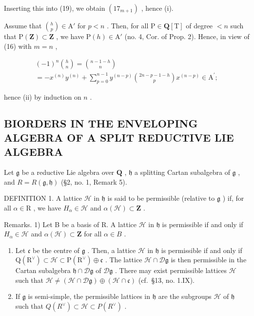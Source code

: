 Inserting this into (19), we obtain \((17_{m + 1})\) , hence (i).

Assume that \(\binom{h}{p} \in \mathrm{A}'\) for \(p < n\) . Then, for all \(\mathrm{P} \in \mathbf{Q}[\mathrm{T}]\) of degree \(< n\) such that \(\mathrm{P}(\mathbf{Z}) \subset \mathbf{Z}\) , we have \(\mathrm{P}(h) \in \mathrm{A}'\) (no. 4, Cor. of Prop. 2). Hence, in view of (16) with \(m = n\) ,

\[
\begin{array}{c} (- 1) ^ {n} \binom{h}{n} = \binom{n - 1 - h}{n} \\ = - x ^ {(n)} y ^ {(n)} + \sum_ {p = 0} ^ {n - 1} y ^ {(n - p)} \binom{2 n - p - 1 - h}{p} x ^ {(n - p)} \in \mathrm{A} ^ {\prime}; \end{array}
\]

hence (ii) by induction on \(n\) .

\subsection{BIORDERS IN THE ENVELOPING ALGEBRA OF A SPLIT REDUCTIVE LIE ALGEBRA}

Let \(\mathfrak{g}\) be a reductive Lie algebra over \(\mathbf{Q}\) , \(\mathfrak{h}\) a splitting Cartan subalgebra of \(\mathfrak{g}\) , and \(R = R(\mathfrak{g},\mathfrak{h})\) (§2, no. 1, Remark 5).

DEFINITION 1. A lattice \(\mathcal{H}\) in \(\mathfrak{h}\) is said to be permissible (relative to \(\mathfrak{g}\) ) if, for all \(\alpha \in \mathrm{R}\) , we have \(H_{\alpha} \in \mathcal{H}\) and \(\alpha(\mathcal{H}) \subset \mathbf{Z}\) .

Remarks. 1) Let B be a basis of R. A lattice \(\mathcal{H}\) in \(\mathfrak{h}\) is permissible if and only if \(H_{\alpha} \in \mathcal{H}\) and \(\alpha(\mathcal{H}) \subset \mathbf{Z}\) for all \(\alpha \in B\) .

\begin{enumerate}
\def\labelenumi{\arabic{enumi})}
\setcounter{enumi}{1}
\item
  Let \(\mathfrak{c}\) be the centre of \(\mathfrak{g}\) . Then, a lattice \(\mathcal{H}\) in \(\mathfrak{h}\) is permissible if and only if \(\mathrm{Q}(\mathrm{R}^{\vee}) \subset \mathcal{H} \subset \mathrm{P}(\mathrm{R}^{\vee}) \oplus \mathfrak{c}\) . The lattice \(\mathcal{H} \cap \mathcal{D}\mathfrak{g}\) is then permissible in the Cartan subalgebra \(\mathfrak{h} \cap \mathcal{D}\mathfrak{g}\) of \(\mathcal{D}\mathfrak{g}\) . There may exist permissible lattices \(\mathcal{H}\) such that \(\mathcal{H} \neq (\mathcal{H} \cap \mathcal{D}\mathfrak{g}) \oplus (\mathcal{H} \cap \mathfrak{c})\) (cf.~§13, no. 1.IX).
\item
  If \(\mathfrak{g}\) is semi-simple, the permissible lattices in \(\mathfrak{h}\) are the subgroups \(\mathcal{H}\) of \(\mathfrak{h}\) such that \(Q(R^{\vee})\subset \mathcal{H}\subset P(R^{\vee})\) .
\end{enumerate}

